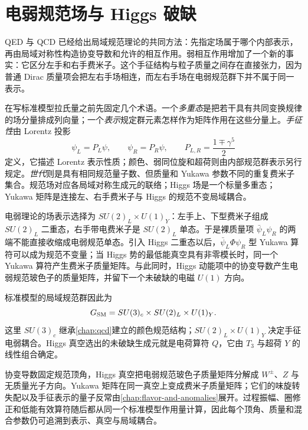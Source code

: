 \chapter{电弱规范场与 Higgs 破缺}\label{chap:standard-model}

QED 与 QCD 已经给出局域规范理论的共同方法：先指定场属于哪个内部表示，再由局域对称性构造协变导数和允许的相互作用。弱相互作用增加了一个新的事实：它区分左手和右手费米子。这个手征结构与粒子质量之间存在直接张力，因为普通 Dirac 质量项会把左右手场相连，而左右手场在电弱规范群下并不属于同一表示。

在写标准模型拉氏量之前先固定几个术语。一个\emph{多重态}是把若干具有共同变换规律的场分量排成列向量；一个\emph{表示}规定群元素怎样作为矩阵作用在这些分量上。\emph{手征性}由 Lorentz 投影
\begin{equation*}
 \psi_L=P_L\psi,\qquad \psi_R=P_R\psi,
 \qquad P_{L,R}=\frac{1\mp\gamma^5}{2}
\end{equation*}
定义，它描述 Lorentz 表示性质；颜色、弱同位旋和超荷则由内部规范群表示另行规定。\emph{世代}则是具有相同规范量子数、但质量和 Yukawa 参数不同的重复费米子集合。规范场对应各局域对称生成元的联络；Higgs 场是一个标量多重态；Yukawa 矩阵是连接左、右手费米子与 Higgs 的规范不变局域耦合。

电弱理论的场表示选择为 $SU(2)_L\times U(1)_Y$：左手上、下型费米子组成 $SU(2)_L$ 二重态，右手带电费米子是 $SU(2)_L$ 单态。于是裸质量项 $\bar\psi_L\psi_R$ 的两端不能直接收缩成电弱规范单态。引入 Higgs 二重态以后，$\bar\psi_L\Phi\psi_R$ 型 Yukawa 算符可以成为规范不变量；当 Higgs 势的最低能真空具有非零模长时，同一个 Yukawa 算符产生费米子质量矩阵。与此同时，Higgs 动能项中的协变导数产生电弱规范玻色子的质量矩阵，并留下一个未破缺的电磁 $U(1)$ 方向。

标准模型的局域规范群因此为
\begin{equation}
 {G_{\rm SM}=SU(3)_c\times SU(2)_L\times U(1)_Y.}
 \label{eq:sm-gauge-group-dp11}
\end{equation}
这里 $SU(3)_c$ 继承\cref{chap:qcd}建立的颜色规范结构；$SU(2)_L\times U(1)_Y$ 决定手征电弱耦合。Higgs 真空选出的未破缺生成元就是电荷算符 $Q$，它由 $T_3$ 与超荷 $Y$ 的线性组合确定。

协变导数固定规范顶角，Higgs 真空把电弱规范玻色子质量矩阵分解成 $W^\pm$、$Z$ 与无质量光子方向。Yukawa 矩阵在同一真空上变成费米子质量矩阵；它们的味旋转失配以及手征表示的量子反常由\cref{chap:flavor-and-anomalies}展开。过程振幅、圈修正和低能有效算符随后都从同一个标准模型作用量计算，因此每个顶角、质量和混合参数仍可追溯到表示、真空与局域耦合。





